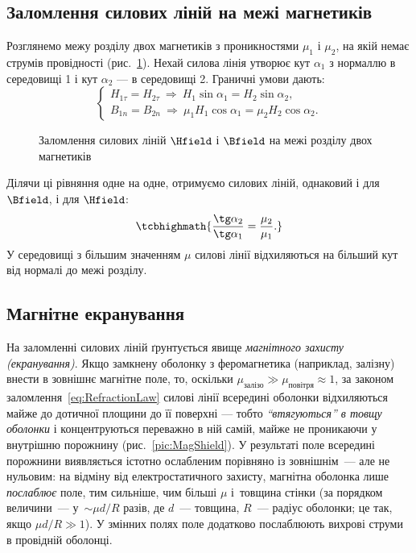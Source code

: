 \subsection*{Заломлення силових ліній на межі магнетиків}

Розглянемо межу розділу двох магнетиків з проникностями $\mu_1$ і $\mu_2$, на якій немає струмів провідності (рис.~\ref{pic:RefractionM}). Нехай
силова лінія утворює кут $\alpha_1$ з нормаллю в середовищі 1 і кут $\alpha_2$ --- в середовищі 2. Граничні умови дають:
\begin{equation*}
	\begin{cases}
		H_{1\tau}=H_{2\tau} \ \Rightarrow\ H_1\sin\alpha_1 = H_2\sin\alpha_2, \\
		B_{1n}=B_{2n} \ \Rightarrow\ \mu_1H_1\cos\alpha_1 = \mu_2H_2\cos\alpha_2.
	\end{cases}
\end{equation*}

\begin{figure}[h!]\centering
	\caption{Заломлення силових ліній $\Hfield$ і $\Bfield$ на межі розділу двох
		магнетиків\label{pic:RefractionM}}
\end{figure}

Ділячи ці рівняння одне на одне, отримуємо  силових ліній, однаковий і для $\Bfield$, і для $\Hfield$:
\begin{equation}\label{eq:RefractionLaw}
	\tcbhighmath{
		\frac{\tg\alpha_2}{\tg\alpha_1} = \frac{\mu_2}{\mu_1}.
	}
\end{equation}
У середовищі з більшим значенням $\mu$ силові лінії відхиляються на більший кут від нормалі до межі розділу.

\subsection*{Магнітне екранування}

На заломленні силових ліній ґрунтується явище \emph{магнітного захисту (екранування)}. Якщо замкнену оболонку з феромагнетика (наприклад,
залізну) внести в зовнішнє магнітне поле, то, оскільки $\mu_\text{залізо} \gg \mu_\text{повітря}\approx 1$, за законом
заломлення~\eqref{eq:RefractionLaw} силові лінії всередині оболонки відхиляються майже до дотичної площини до її поверхні --- тобто
\emph{\enquote{втягуються} в товщу оболонки} і концентруються переважно в ній самій, майже не проникаючи у внутрішню порожнину
(рис.~\ref{pic:MagShield}). У результаті поле всередині порожнини виявляється істотно ослабленим порівняно із зовнішнім~--- але не
нульовим: на відміну від електростатичного захисту, магнітна оболонка лише \emph{послаблює} поле, тим сильніше, чим більші $\mu$ і~товщина
стінки (за порядком величини~--- у~$\sim\mu d/R$ разів, де $d$~--- товщина, $R$~--- радіус оболонки; це так, якщо $\mu d/R\gg1$). У змінних полях поле додатково послаблюють вихрові струми в провідній оболонці.

